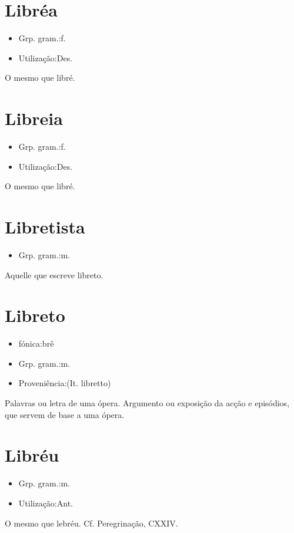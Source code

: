 \section{Libréa}
\begin{itemize}
\item {Grp. gram.:f.}
\end{itemize}
\begin{itemize}
\item {Utilização:Des.}
\end{itemize}
O mesmo que \textunderscore libré\textunderscore .
\section{Libreia}
\begin{itemize}
\item {Grp. gram.:f.}
\end{itemize}
\begin{itemize}
\item {Utilização:Des.}
\end{itemize}
O mesmo que \textunderscore libré\textunderscore .
\section{Libretista}
\begin{itemize}
\item {Grp. gram.:m.}
\end{itemize}
Aquelle que escreve libreto.
\section{Libreto}
\begin{itemize}
\item {fónica:brê}
\end{itemize}
\begin{itemize}
\item {Grp. gram.:m.}
\end{itemize}
\begin{itemize}
\item {Proveniência:(It. \textunderscore libretto\textunderscore )}
\end{itemize}
Palavras ou letra de uma ópera.
Argumento ou exposição da acção e episódios, que servem de base a uma ópera.
\section{Libréu}
\begin{itemize}
\item {Grp. gram.:m.}
\end{itemize}
\begin{itemize}
\item {Utilização:Ant.}
\end{itemize}
O mesmo que \textunderscore lebréu\textunderscore . Cf. \textunderscore Peregrinação\textunderscore , CXXIV.

